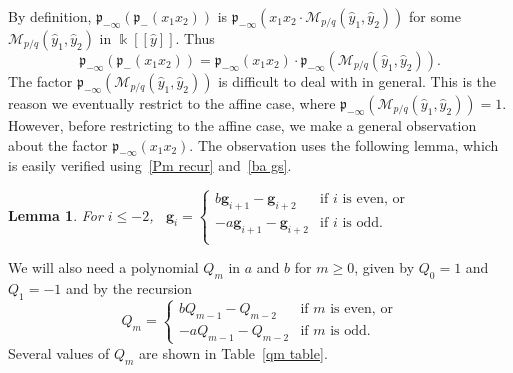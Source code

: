 \documentclass[10pt,a4paper]{amsart}
\newtheorem{lemma}[theorem]{Lemma}
\theoremstyle{definition}
\newcommand\llbracket{[\![}
\newcommand\rrbracket{]\!]}
\newcommand{\p}{{\mathfrak p}}
\newcommand{\g}{\mathbf{g}}
\renewcommand{\k}{\Bbbk}
\newcommand{\M}{\mathcal{M}}
\newcommand{\hy}{\hat{y}}
\begin{document}
By definition, $\p_{-\infty}(\p_-(x_1x_2))$ is $\p_{-\infty}(x_1x_2\cdot\M_{p/q}(\hy_1,\hy_2))$ for some $\M_{p/q}(\hy_1,\hy_2)$ in $\k\llbracket \hy\rrbracket $.
Thus 
\begin{equation}\label{p M}
\p_{-\infty}(\p_-(x_1x_2))=\p_{-\infty}(x_1x_2)\cdot\p_{-\infty}(\M_{p/q}(\hy_1,\hy_2)).
\end{equation}
The factor $\p_{-\infty}(\M_{p/q}(\hy_1,\hy_2))$ is difficult to deal with in general.
This is the reason we eventually restrict to the affine case, where $\p_{-\infty}(\M_{p/q}(\hy_1,\hy_2))=1$.
However, before restricting to the affine case, we make a general observation about the factor $\p_{-\infty}(x_1x_2)$.
The observation uses the following lemma, which is easily verified using~\eqref{Pm recur} and~\eqref{ba gs}.
\begin{lemma}\label{deal with gs}
For $i\le-2$, \,
$\g_i=\begin{cases}
b\g_{i+1}-\g_{i+2}&\text{if }i\text{ is even, or}\\
-a\g_{i+1}-\g_{i+2}&\text{if }i\text{ is odd.}\\
\end{cases}$
\end{lemma}


We will also need a polynomial $Q_m$ in $a$ and $b$ for $m\ge0$, given by $Q_0=1$ and $Q_1=-1$ and by the recursion 
\begin{equation}\label{Qm recur}
Q_m=\begin{cases}
bQ_{m-1}-Q_{m-2}&\text{if }m\text{ is even, or}\\
-aQ_{m-1}-Q_{m-2}&\text{if }m\text{ is odd.}
\end{cases}
\end{equation}
Several values of $Q_m$ are shown in Table~\ref{qm table}.
\end{document}
